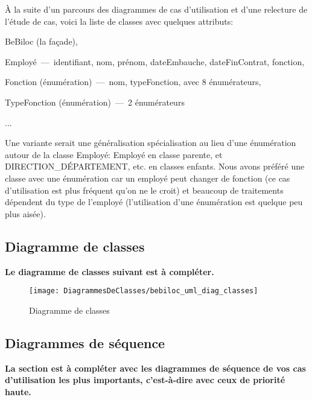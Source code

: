 \documentclass[11pt,article]{article}
\begin{document}
À la suite d'un parcours des diagrammes de cas d'utilisation et d'une
relecture de l'étude de cas, voici la liste de classes avec quelques
attributs:
\begin{compactitem}
\item \textsf{BeBiloc} (la façade),
\item \textsf{Employé}~---~identifiant, nom, prénom, dateEmbauche, dateFinContrat, fonction,
\item \textsf{Fonction} (énumération)~---~nom, typeFonction, avec 8 énumérateurs,
\item \textsf{TypeFonction} (énumération)~---~2 énumérateurs
\item ...
\end{compactitem}

\bigskip

Une variante serait une généralisation spécialisation au lieu d'une
énumération autour de la classe \textsf{Employé}: \textsf{Employé} en
classe parente, et \textsf{DIRECTION\_DÉPARTEMENT}, etc. en classes
enfants. Nous avons préféré une classe avec une énumération car un
employé peut changer de fonction (ce cas d'utilisation est plus
fréquent qu'on ne le croit) et beaucoup de traitements dépendent du
type de l'employé (l'utilisation d'une énumération est quelque peu
plus aisée).

\newpage

\subsection{Diagramme de classes}

{\color{red}\textbf{Le diagramme de classes suivant est à compléter.}}

\begin{figure}[h!]
\begin{center}
\texttt{[image: DiagrammesDeClasses/bebiloc\_uml\_diag\_classes]}
\caption{Diagramme de classes}
\end{center}
\label{umlet_diag_classes}
\end{figure}

\newpage

\subsection{Diagrammes de séquence}

{\color{red}\textbf{La section est à compléter avec les diagrammes de séquence de vos cas d'utilisation les plus importants, c'est-à-dire avec ceux de priorité haute.}}
\end{document}
